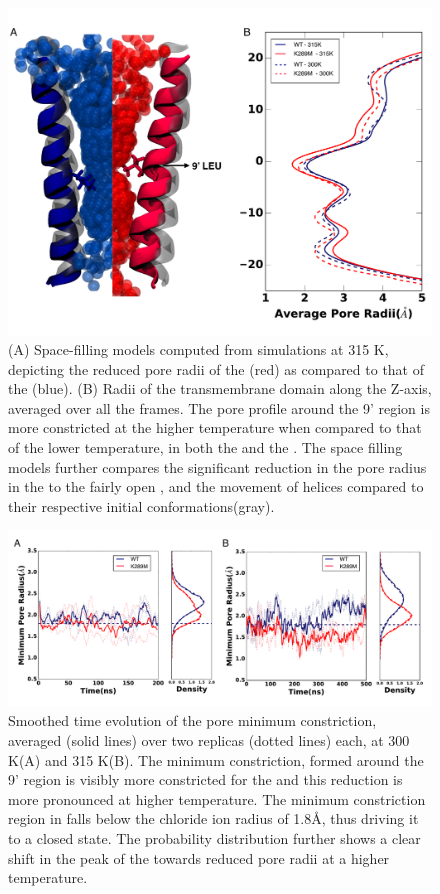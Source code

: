 \documentclass[journal=jacsat,manuscript=article]{achemso}
\begin{document}
\begin{figure}
\begin{center}
\includegraphics[width = 1\textwidth]{figures/pore_radd_fill.pdf}
\end{center}
\caption{(A) Space-filling models computed from simulations at 315 K, depicting the reduced pore radii of the \MT(red) as compared to that of the \WT(blue). (B) Radii of the transmembrane domain along the Z-axis, averaged over all the frames. The pore profile around the 9' region is more constricted at the higher temperature when compared to that of the lower temperature, in both the \WT and the \MT. The space filling models further compares the significant reduction in the pore radius in the \MT to the fairly open \WT, and the movement of helices compared to their respective initial conformations(gray).}
\label{fig:pore-profile}
\end{figure}

\begin{figure}
\begin{center}
\includegraphics[width = 1\textwidth]{figures/min_pore_radd.pdf}
\end{center}
\caption{Smoothed time evolution of the pore minimum constriction, averaged (solid lines) over two replicas (dotted lines) each, at 300 K(A) and 315 K(B). The minimum constriction, formed around the 9' region is visibly more constricted for the \MTs and this reduction is more pronounced at higher temperature. The minimum constriction region in \MT falls below the chloride ion radius of 1.8\AA, thus driving it to a closed state. The probability distribution further shows a clear shift in the peak of the \MTs towards reduced pore radii at a higher temperature.}
\label{fig:pore-evolution}
\end{figure}
\end{document}
